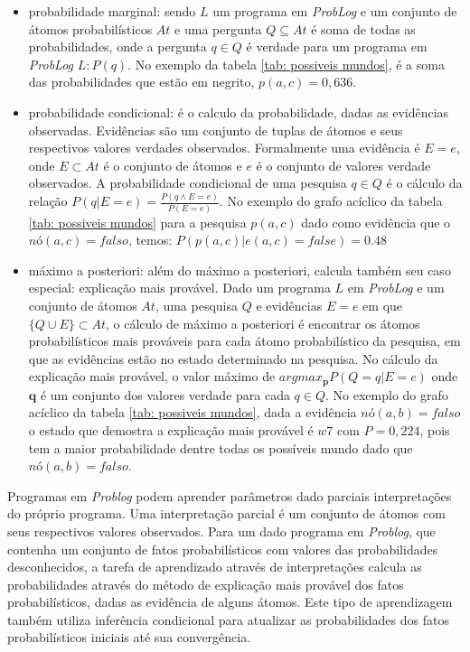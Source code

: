 \documentclass[
	12pt,				%
    oneside,			%
	a4paper,			%
	english,			%
	french,				%
	spanish,			%
	brazil,				%
	]{abntex2}
\begin{document}
\begin{itemize}
    \item probabilidade marginal: sendo $L$ um programa em \textit{ProbLog} e um conjunto de átomos probabilísticos $At$ e uma pergunta $Q \subseteq At$ é soma de todas as probabilidades, onde a pergunta $q \in Q$ é verdade para um programa em \textit{ProbLog} $L: P(q)$. No exemplo da tabela \ref{tab: possiveis mundos}, é a soma das probabilidades que estão em negrito, $p(a, c)=0,636$.
    
    \item probabilidade condicional: é o calculo da probabilidade, dadas as evidências observadas. Evidências são um conjunto de tuplas de átomos e seus respectivos valores verdades observados. Formalmente uma evidência é $E=e$, onde $E \subset At$ é o conjunto de átomos e $e$ é o conjunto de valores verdade observados. A probabilidade condicional de uma pesquisa $q \in Q$ é o cálculo da relação \(P(q|E=e)=\frac{P(q\wedge E=e)}{P(E=e)}\). No exemplo do grafo acíclico da tabela \ref{tab: possiveis mundos} para a pesquisa $p(a,c)$ dado como evidência que o $nó(a,c)=falso$, temos: $P(p(a, c)|e(a, c) = false) =0.48$ 
    
    \item máximo a posteriori: além do máximo a posteriori, calcula também seu caso especial: explicação mais provável. Dado um programa $L$ em \textit{ProbLog} e um conjunto de átomos $At$, uma pesquisa $Q$ e evidências $E=e$ em que $\{Q \cup E\}\subset At$, o cálculo de máximo a posteriori é encontrar os átomos probabilísticos mais prováveis para cada átomo probabilístico da pesquisa, em que as evidências estão no estado determinado na pesquisa. No cálculo da explicação mais provável, o valor máximo de $argmax_\textbf{p}P(Q=q|E=e)$ onde $\textbf{q}$ é um conjunto dos valores verdade para cada $q\in Q$. No exemplo do grafo acíclico da tabela \ref{tab: possiveis mundos}, dada a evidência $nó(a,b)= falso$ o estado que demostra a explicação mais provável é $w7$ com $P=0,224$, pois tem a maior probabilidade dentre todas os possíveis mundo dado que $nó(a,b)= falso$.
    
\end{itemize} 

Programas em \textit{Problog} podem aprender parâmetros dado parciais interpretações do próprio programa. Uma interpretação parcial é um conjunto de átomos com seus respectivos valores observados. Para um dado programa em \textit{Problog}, que contenha um conjunto de fatos probabilísticos com valores das probabilidades desconhecidos, a tarefa de aprendizado através de interpretações calcula as probabilidades através do método de explicação mais provável dos fatos probabilísticos, dadas as evidência de alguns átomos. Este tipo de aprendizagem também utiliza inferência condicional para atualizar as probabilidades dos fatos probabilísticos iniciais até sua convergência.
\end{document}
